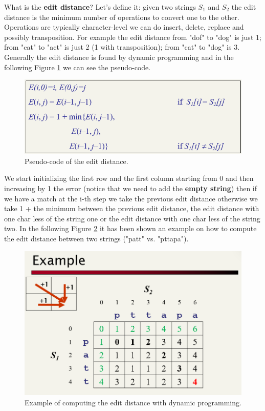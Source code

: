 What is the \textbf{edit distance}? Let's define it: given two strings $S_1$ and $S_2$ the edit distance is the minimum number of operations to convert one to the other. Operations are typically character-level we can do insert, delete, replace and possibly transposition.\newline
For example the edit distance from "dof" to "dog" is just 1; from "cat" to "act" is just 2 (1 with transposition); from "cat" to "dog" is 3.\newline
Generally the edit distance is found by dynamic programming and in the following Figure \ref{fig:pseudocodedit} we can see the pseudo-code. 
\begin{figure}
    \centering
    \includegraphics[width=0.75\linewidth]{images/pseudoedit.png}
    \caption{Pseudo-code of the edit distance.}
    \label{fig:pseudocodedit}
\end{figure}
We start initializing the first row and the first column starting from 0 and then increasing by 1 the error (notice that we need to add the \textbf{empty string}) then if we have a match at the i-th step we take the previous edit distance otherwise we take 1 + the minimum between the previous edit distance, the edit distance with one char less of the string one or the edit distance with one char less of the string two. In the following Figure \ref{fig:editdistancexample} it has been shown an example on how to compute the edit distance between two strings ("patt" vs. "pttapa").\newline
\begin{figure}
    \centering
    \includegraphics[width=0.75\linewidth]{images/exampleditdistance.png}
    \caption{Example of computing the edit distance with dynamic programming.}
    \label{fig:editdistancexample}
\end{figure}
